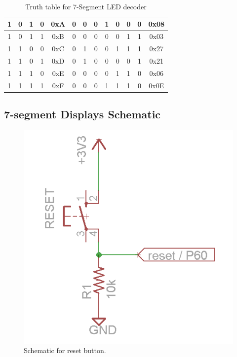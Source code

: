 \documentclass[11pt]{article}
\begin{document}
\begin{table}[h]
\begin{tabular}{|c|c|c|c|c|c|c|c|c|c|c|c|c|}
1        & 0        & 1        & 0        & 0xA   & 0 & 0 & 0 & 1 & 0 & 0 & 0 & 0x08  \\ \hline
1        & 0        & 1        & 1        & 0xB   & 0 & 0 & 0 & 0 & 0 & 1 & 1 & 0x03  \\ \hline
1        & 1        & 0        & 0        & 0xC   & 0 & 1 & 0 & 0 & 1 & 1 & 1 & 0x27  \\ \hline
1        & 1        & 0        & 1        & 0xD   & 0 & 1 & 0 & 0 & 0 & 0 & 1 & 0x21  \\ \hline
1        & 1        & 1        & 0        & 0xE   & 0 & 0 & 0 & 0 & 1 & 1 & 0 & 0x06  \\ \hline
1        & 1        & 1        & 1        & 0xF   & 0 & 0 & 0 & 1 & 1 & 1 & 0 & 0x0E  \\ \hline
\end{tabular}
\caption{Truth table for 7-Segment LED decoder}
\label{table:7seg_decoder}
\end{table}


\subsection{7-segment Displays Schematic}


\begin{figure}[h!]
\centering
\includegraphics[scale=0.54]{reset.png}
\caption{Schematic for reset button.}
\label{fig:reset_sch}
\end{figure} 
\end{document}
